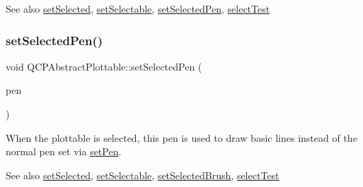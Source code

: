 \begin{DoxySeeAlso}{See also}
\mbox{\hyperlink{class_q_c_p_abstract_plottable_afbd5428c2952f59d952e11ab5cd79176}{set\+Selected}}, \mbox{\hyperlink{class_q_c_p_abstract_plottable_a22c69299eb5569e0f6bf084877a37dc4}{set\+Selectable}}, \mbox{\hyperlink{class_q_c_p_abstract_plottable_a6911603cad23ab0469b108224517516f}{set\+Selected\+Pen}}, \mbox{\hyperlink{class_q_c_p_abstract_plottable_a38efe9641d972992a3d44204bc80ec1d}{select\+Test}} 
\end{DoxySeeAlso}
\mbox{\label{class_q_c_p_abstract_plottable_a6911603cad23ab0469b108224517516f}} 
\subsubsection{\texorpdfstring{set\+Selected\+Pen()}{setSelectedPen()}}
{\footnotesize\ttfamily void Q\+C\+P\+Abstract\+Plottable\+::set\+Selected\+Pen (\begin{DoxyParamCaption}\item[{const Q\+Pen \&}]{pen }\end{DoxyParamCaption})}

When the plottable is selected, this pen is used to draw basic lines instead of the normal pen set via \mbox{\hyperlink{class_q_c_p_abstract_plottable_ab74b09ae4c0e7e13142fe4b5bf46cac7}{set\+Pen}}.

\begin{DoxySeeAlso}{See also}
\mbox{\hyperlink{class_q_c_p_abstract_plottable_afbd5428c2952f59d952e11ab5cd79176}{set\+Selected}}, \mbox{\hyperlink{class_q_c_p_abstract_plottable_a22c69299eb5569e0f6bf084877a37dc4}{set\+Selectable}}, \mbox{\hyperlink{class_q_c_p_abstract_plottable_ae8c816874089f7a44001e8618e81a9dc}{set\+Selected\+Brush}}, \mbox{\hyperlink{class_q_c_p_abstract_plottable_a38efe9641d972992a3d44204bc80ec1d}{select\+Test}} 
\end{DoxySeeAlso}
\mbox{\label{class_q_c_p_abstract_plottable_a71626a07367e241ec62ad2c34baf21cb}} 
